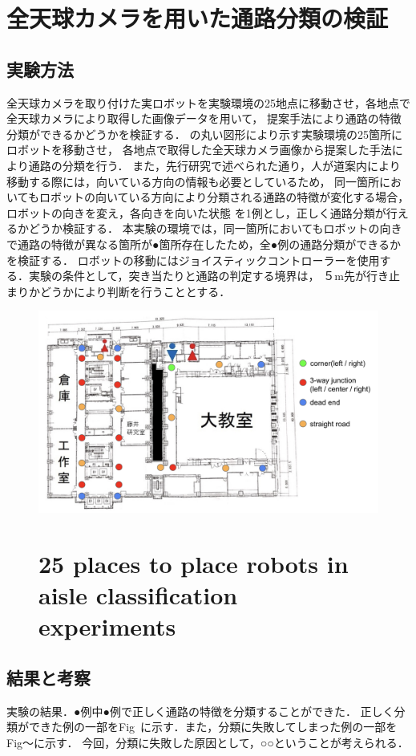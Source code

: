 \documentclass[../main]{subfiles}
\begin{document}
    \section{全天球カメラを用いた通路分類の検証}
        \subsection{実験方法}
        全天球カメラを取り付けた実ロボットを実験環境の25地点に移動させ，各地点で全天球カメラにより取得した画像データを用いて，
        提案手法により通路の特徴分類ができるかどうかを検証する．
        の丸い図形により示す実験環境の25箇所にロボットを移動させ，
        各地点で取得した全天球カメラ画像から提案した手法により通路の分類を行う．
        また，先行研究で述べられた通り，人が道案内により移動する際には，向いている方向の情報も必要としているため，
        同一箇所においてもロボットの向いている方向により分類される通路の特徴が変化する場合，ロボットの向きを変え，各向きを向いた状態
        を1例とし，正しく通路分類が行えるかどうか検証する．
        本実験の環境では，同一箇所においてもロボットの向きで通路の特徴が異なる箇所が●箇所存在したため，全●例の通路分類ができるかを検証する．
        ロボットの移動にはジョイスティックコントローラーを使用する．実験の条件として，突き当たりと通路の判定する境界は，
        ５m先が行き止まりかどうかにより判断を行うこととする．

        \begin{figure}[H]
         \centering
         \includegraphics[width=20cm]{../images/experiment_point.png}
         \section{25 places to place robots in aisle classification experiments}
         \label{figure::experiment_point}
        \end{figure}

        \subsection{結果と考察}
        実験の結果．●例中●例で正しく通路の特徴を分類することができた．
        正しく分類ができた例の一部をFig~に示す．また，分類に失敗してしまった例の一部をFig〜に示す．
        今回，分類に失敗した原因として，○○ということが考えられる．
\end{document}
